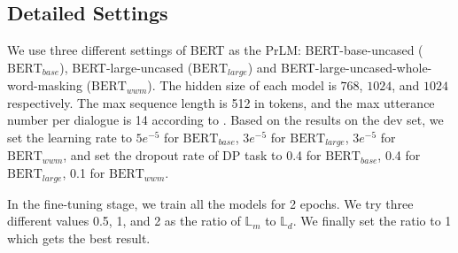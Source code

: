 \documentclass[11pt]{article}
\begin{document}
\subsection{Detailed Settings}\label{subsec:detailed settings}
We use three different settings of BERT \cite{devlin-etal-2019-bert} as the PrLM: BERT-base-uncased ($\textrm{BERT}_{base}$), BERT-large-uncased ($\textrm{BERT}_{large}$) and BERT-large-uncased-whole-word-masking ($\textrm{BERT}_{wwm}$).
The hidden size of each model is $768$, $1024$, and $1024$ respectively. The max sequence length is 512 in tokens, and the max utterance number per dialogue is 14 according to . Based on the results on the dev set, we set the learning rate to $5e^{-5}$ for $\textrm{BERT}_{base}$, $3e^{-5}$ for $\textrm{BERT}_{large}$, $3e^{-5}$ for $\textrm{BERT}_{wwm}$, and set the dropout rate of DP task to 0.4 for $\textrm{BERT}_{base}$, 0.4 for $\textrm{BERT}_{large}$, 0.1 for $\textrm{BERT}_{wwm}$. 

In the fine-tuning stage, we train all the models for 2 epochs. We try three different values 0.5, 1, and 2 as the ratio of $\mathbb{L}_m$ to $\mathbb{L}_d$. We finally set the ratio to 1 which gets the best result.
\end{document}
